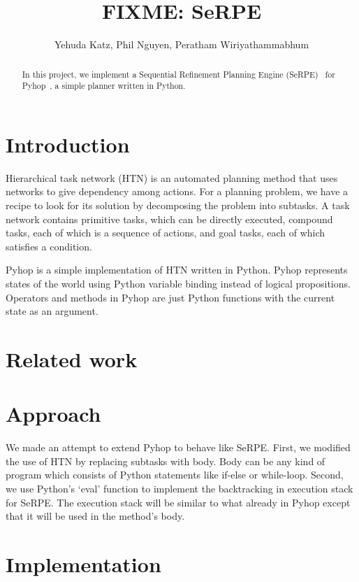 \documentclass[11pt]{article} %
\title{FIXME: SeRPE}
\author{Yehuda Katz, Phil Nguyen, Peratham Wiriyathammabhum}
\begin{document}
\maketitle

\begin{abstract}
In this project, we implement a Sequential Refinement Planning Engine
(SeRPE)~\cite{disgusting-draft} for Pyhop~\cite{pyhop},
a simple planner written in Python.
\end{abstract}

\section{Introduction}

Hierarchical task network (HTN) is an automated planning method that uses networks
to give dependency among actions.
For a planning problem, we have a recipe to look for its solution
by decomposing the problem into subtasks.
A task network contains primitive tasks, which can be directly executed,
compound tasks, each of which is a sequence of actions,
and goal tasks, each of which satisfies a condition.

Pyhop is a simple implementation of HTN written in Python. 
Pyhop represents states of the world using Python variable binding
 instead of logical propositions. Operators and methods in Pyhop are
 just Python functions with the current state as an argument.



\section{Related work}

\section{Approach}
We made an attempt to extend Pyhop to behave like SeRPE. 
First, we modified the use of HTN by replacing subtasks with 
body. Body can be any kind of program which consists of
 Python statements like if-else or while-loop.
Second, we use Python's `eval' function to implement the 
backtracking in execution stack for SeRPE. The execution 
stack will be similar to what already in Pyhop except that
it will be used in the method's body.

\section{Implementation}
\end{document}
